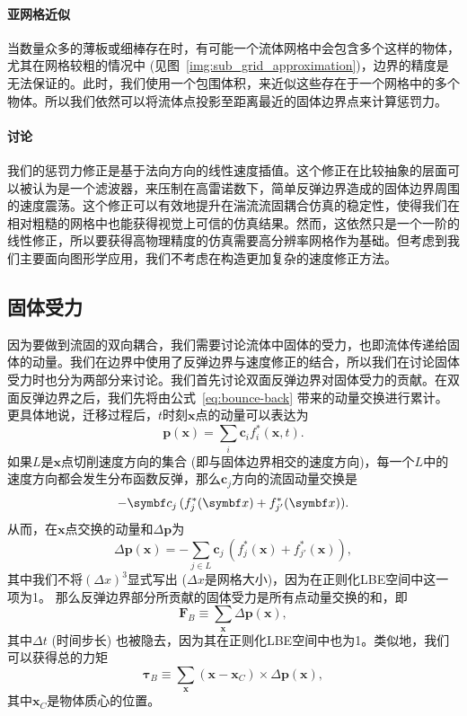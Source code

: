 \paragraph{亚网格近似}
当数量众多的薄板或细棒存在时，有可能一个流体网格中会包含多个这样的物体，尤其在网格较粗的情况中 (见图~\ref{img:sub_grid_approximation})，边界的精度是无法保证的。此时，我们使用一个包围体积，来近似这些存在于一个网格中的多个物体。所以我们依然可以将流体点投影至距离最近的固体边界点来计算惩罚力。

\paragraph{讨论}
我们的惩罚力修正是基于法向方向的线性速度插值。这个修正在比较抽象的层面可以被认为是一个滤波器，来压制在高雷诺数下，简单反弹边界造成的固体边界周围的速度震荡。这个修正可以有效地提升在湍流流固耦合仿真的稳定性，使得我们在相对粗糙的网格中也能获得视觉上可信的仿真结果。然而，这依然只是一个一阶的线性修正，所以要获得高物理精度的仿真需要高分辨率网格作为基础。但考虑到我们主要面向图形学应用，我们不考虑在构造更加复杂的速度修正方法。

\subsection{固体受力}
因为要做到流固的双向耦合，我们需要讨论流体中固体的受力，也即流体传递给固体的动量。我们在边界中使用了反弹边界与速度修正的结合，所以我们在讨论固体受力时也分为两部分来讨论。我们首先讨论双面反弹边界对固体受力的贡献。在双面反弹边界之后，我们先将由公式~\ref{eq:bounce-back} 带来的动量交换进行累计。更具体地说，迁移过程后，$t$时刻$\bm{x}$点的动量可以表达为
\begin{equation}
  \bm{p}(\bm{x}) = \sum_{i}\bm{c}_if^*_i(\bm{x},t).
\end{equation}
如果$L$是$\bm{x}$点切削速度方向的集合 (即与固体边界相交的速度方向)，每一个$L$中的速度方向都会发生分布函数反弹，那么$\bm{c}_j$方向的流固动量交换是
\begin{equation}
  \smash{-\bm{c}_{j}\,(f^*_{j}(\bm{x}) + f^*_{j'}(\bm{x}))}.
\end{equation}
从而，在$\bm{x}$点交换的动量和$\Delta \bm{p}$为
\begin{equation}
\Delta \bm{p}(\bm{x})= - \sum_{j\in L} \bm{c}_{j}\,(f^*_{j}(\bm{x}) + f^*_{j'}(\bm{x})),
\end{equation}
其中我们不将$(\Delta x)^3$显式写出 ($\Delta x$是网格大小)，因为在正则化LBE空间中这一项为1。
那么反弹边界部分所贡献的固体受力是所有点动量交换的和，即
\begin{equation}
\bm{F}_{B}\equiv \sum_{\bm{x}} \Delta \bm{p}(\bm{x}),
\end{equation}
其中$\Delta t$ (时间步长) 也被隐去，因为其在正则化LBE空间中也为1。类似地，我们可以获得总的力矩
\begin{equation}
\bm{\tau}_{B}\equiv \sum_{\bm{x}} (\bm{x}-\bm{x}_{C})\times\Delta \bm{p}(\bm{x}),
\end{equation}
其中$\bm{x}_{C}$是物体质心的位置。

